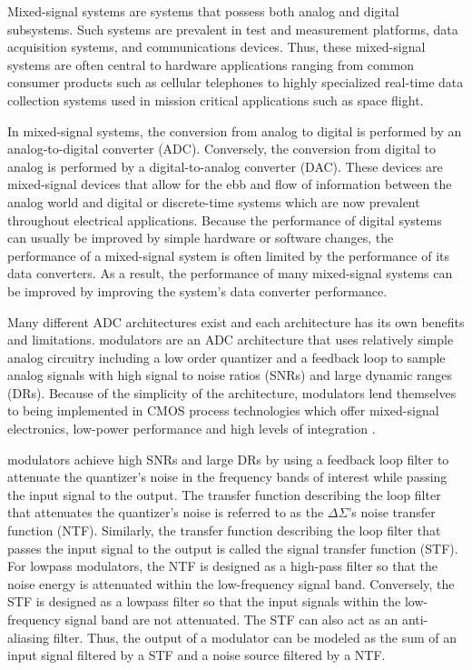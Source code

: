 %
%

Mixed-signal systems are systems that possess both analog and digital subsystems. Such
systems are prevalent in test and measurement platforms, data acquisition systems, and
communications devices. Thus, these mixed-signal systems are often central to hardware
applications ranging from common consumer products such as cellular telephones to highly
specialized real-time data collection systems used in mission critical applications such
as space flight.

In mixed-signal systems, the conversion from analog to digital is performed by
an analog-to-digital converter (ADC). Conversely, the conversion from
digital to analog is performed by a digital-to-analog converter (DAC).
These devices are mixed-signal devices that allow for the
ebb and flow of information between the analog world and digital or discrete-time systems
which are now prevalent throughout electrical applications. Because the performance of
digital systems can usually be improved by simple hardware or software changes, the
performance of a mixed-signal system is often limited by the performance of its data
converters.  As a result, the performance of many mixed-signal systems can be improved by
improving the system's data converter performance.

Many different ADC architectures exist and each architecture has its own benefits and
limitations. \DS modulators are an ADC architecture that uses relatively simple analog
circuitry including a low order quantizer and a feedback loop to sample analog signals
with high signal to noise ratios (SNRs) and large dynamic ranges (DRs).  
Because of the simplicity of the architecture, \DS modulators lend themselves to being
implemented in CMOS process technologies which offer mixed-signal electronics, low-power
performance and high levels of integration \cite{kester_analog_2006}.

\DS modulators achieve high SNRs and large DRs by using a feedback loop
filter to attenuate the quantizer's noise in the frequency bands of interest while passing
the input signal to the output. The transfer function describing the loop filter that
attenuates the quantizer's noise is referred to as the $\Delta\Sigma$'s noise transfer
function (NTF). Similarly, the transfer function describing the loop filter that passes
the input signal to the output is called the signal transfer function (STF).  For lowpass
\DS modulators, the NTF is designed as a high-pass filter so that the noise energy is
attenuated within the low-frequency signal band. Conversely, the STF is designed as a
lowpass filter so that the input signals within the low-frequency signal band are not
attenuated. The STF can also act as an anti-aliasing filter. Thus, the output of a \DS
modulator can be modeled as the sum of an input signal filtered by a STF and a noise
source filtered by a NTF.

